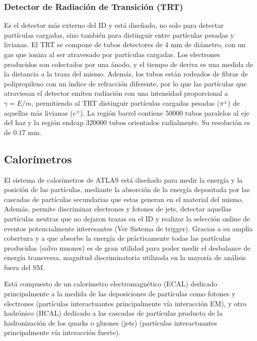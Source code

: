 
\subsubsection{Detector de Radiación de Transición (TRT)}

Es el detector más externo del ID y está diseñado, no solo para detectar partículas cargadas, sino también para distinguir entre partículas pesadas y livianas. El TRT se compone de tubos detectores de $4$ mm de diámetro, con un gas que ioniza al ser atravesado por partículas cargadas. Los electrones producidos son colectados por una ánodo, y el tiempo de deriva es una medida de la distancia a la traza del mismo. Además, los tubos están rodeados de fibras de polipropileno con un índice de refracción diferente, por lo que las partículas que atraviesan el detector emiten radiación con una intensidad proporcional a $\gamma=E/m$, permitiendo al TRT  distinguir partículas cargadas pesadas ($\pi^{\pm}$) de aquellas más livianas ($e^{\pm}$). La región barrel contiene $50000$ tubos paralelos al eje del haz y la región endcap $320000$ tubos orientados radialmente. Su resolución es de $0.17$ mm.

\subsection{Calorímetros}


El sistema de calorímetros de ATLAS está diseñado para medir la energía y la posición de las partículas, mediante la absorción de la energía depositada por las cascadas de partículas secundarias que estas generan en el material del mismo. Además, permite discriminar electrones y fotones de jets, detectar aquellas partículas neutras que no dejaron trazas en el ID y realizar la selección online de eventos potencialmente interesantes (Ver Sistema de trigger). Gracias a su amplia cobertura y a que absorbe la energía de prácticamente todas las partículas producidas (salvo muones) es de gran utilidad para poder medir el desbalance de energía transversa, magnitud discriminatoria utilizada en la mayoría de análisis fuera del SM.

Está compuesto de un calorímetro electromagnético (ECAL) dedicado principalmente a la medida de las deposiciones de partículas como fotones y electrones (partículas interactuantes principalmente vía interacción EM), y otro hadrónico (HCAL) dedicado a las cascadas de partículas producto de la hadronización de los quarks o gluones (jets) (partículas interactuantes principalmente vía interacción fuerte).

